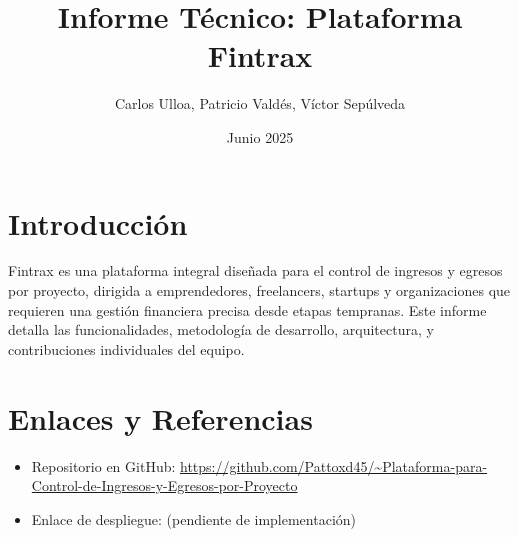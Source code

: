 \documentclass[12pt, a4paper]{article}
\title{Informe Técnico: Plataforma Fintrax}
\author{Carlos Ulloa, Patricio Valdés, Víctor Sepúlveda}
\date{Junio 2025}
\begin{document}
\begin{titlepage}
    \maketitle
    \thispagestyle{empty} %
\end{titlepage}
\newpage
\tableofcontents
\thispagestyle{empty} %
\newpage
\section{Introducción}
Fintrax es una plataforma integral diseñada para el control de ingresos y egresos por proyecto, dirigida a emprendedores, freelancers, startups y organizaciones que requieren una gestión financiera precisa desde etapas tempranas. Este informe detalla las funcionalidades, metodología de desarrollo, arquitectura, y contribuciones individuales del equipo.
\newpage
% 
% 
% 

% 

% 

% 

% 

\section{Enlaces y Referencias}
\begin{itemize}
    \item Repositorio en GitHub: \url{https://github.com/Pattoxd45/~Plataforma-para-Control-de-Ingresos-y-Egresos-por-Proyecto}
    \item Enlace de despliegue: (pendiente de implementación)
\end{itemize}

\end{document}
